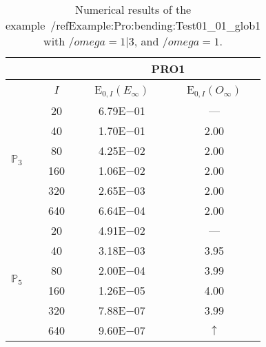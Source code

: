 \begin{table}[H]
\caption{Numerical results of the example~/ref{Example:Pro:bending:Test01_01_glob1} with $/omega=1|3$, and $/omega=1$.}
\setlength{\tabcolsep}{5pt}
\centering
\begin{tabular}{@{}l c c c@{}}
\toprule
 &  & \multicolumn{2}{c}{PRO1}\\
\midrule
 & $I$ & E$_{0,I}(E_{\infty})$ & E$_{0,I}(O_{\infty})$\\
\midrule
\multirow{6}{*}{$\mathbb{P}_{3}$}
 & 20 & 6.79E$-$01 & ---\\
 & 40 & 1.70E$-$01 & 2.00\\
 & 80 & 4.25E$-$02 & 2.00\\
 & 160 & 1.06E$-$02 & 2.00\\
 & 320 & 2.65E$-$03 & 2.00\\
 & 640 & 6.64E$-$04 & 2.00\\
\midrule
\multirow{6}{*}{$\mathbb{P}_{5}$}
 & 20 & 4.91E$-$02 & ---\\
 & 40 & 3.18E$-$03 & 3.95\\
 & 80 & 2.00E$-$04 & 3.99\\
 & 160 & 1.26E$-$05 & 4.00\\
 & 320 & 7.88E$-$07 & 3.99\\
 & 640 & 9.60E$-$07 & $\uparrow$\\
\bottomrule
\end{tabular}
\label{Table:PRO:test_01_01_test28_pro1}
\end{table}
